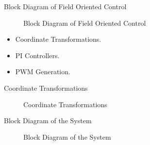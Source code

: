 \begin{frame}{Block Diagram of Field Oriented Control}
	\begin{figure}
		\centering

		\caption{Block Diagram of Field Oriented Control}
	\end{figure}
	\begin{itemize}
		\item Coordinate Transformations.
		\item PI Controllers.
		\item PWM Generation.
	\end{itemize}
\end{frame}


\begin{frame}{Coordinate Transformations}
	\begin{figure}
		\centering
		\caption{Coordinate Transformations}
	\end{figure}
\end{frame}


\begin{frame}{Block Diagram of the System}
	\begin{figure}
		\centering

		\caption{Block Diagram of the System}
	\end{figure}
\end{frame}

